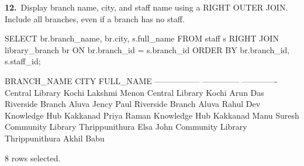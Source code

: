 \noindent\begin{minipage}{\linewidth}
\begingroup{}
{\fontsize{14}{17}\selectfont\textbf{12.}}\ Display branch name, city, and staff name using a RIGHT OUTER JOIN. Include all branches, even if a branch has no staff.\par
\endgroup\vspace{12pt}


\begin{sqlcode}
SELECT br.branch_name, br.city, s.full_name
FROM staff s
RIGHT JOIN library_branch br ON br.branch_id = s.branch_id
ORDER BY br.branch_id, s.staff_id;
\end{sqlcode}

\vspace{18pt}


\begin{sqlout}[fontsize=\small]
BRANCH_NAME        CITY            FULL_NAME    
-----------------  --------------  -------------
Central Library    Kochi           Lakshmi Menon
Central Library    Kochi           Arun Das
Riverside Branch   Aluva           Jency Paul
Riverside Branch   Aluva           Rahul Dev
Knowledge Hub      Kakkanad        Priya Raman
Knowledge Hub      Kakkanad        Manu Suresh
Community Library  Thrippunithura  Elsa John
Community Library  Thrippunithura  Akhil Babu

8 rows selected.
\end{sqlout}
\end{minipage}\par\vspace{24pt}

